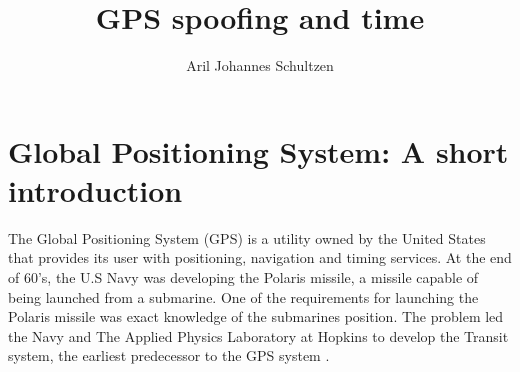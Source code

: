 \documentclass[12pt,english,a4paper]{article}
\title{GPS spoofing and time}
\author{Aril Johannes Schultzen}
\begin{document}
\maketitle
\thispagestyle{empty}
\setcounter{page}{0}
\tableofcontents
\thispagestyle{empty}
\setcounter{page}{0}
\thispagestyle{empty}
\setcounter{page}{0}
\clearpage
\setcounter{page}{1}

\section{Global Positioning System: A short introduction}
The Global Positioning System (GPS) is a utility owned by the United States that provides its user with positioning, navigation and timing services. At the end of 60's, the U.S Navy was developing the Polaris missile, a missile capable of being launched from a submarine. One of the requirements for launching the Polaris missile was exact knowledge of the submarines position. The problem led the Navy and The Applied Physics Laboratory at Hopkins to develop the Transit system, the earliest predecessor to the GPS system \cite{SteJ}.
\end{document}
